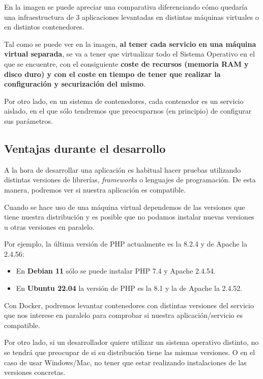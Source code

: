 En la imagen se puede apreciar una comparativa diferenciando cómo quedaría una infraestructura de 3 aplicaciones levantadas en distintas máquinas virtuales o en distintos contenedores.

Tal como se puede ver en la imagen, \textbf{al tener cada servicio en una máquina virtual separada}, se va a tener que virtualizar todo el Sistema Operativo en el que se encuentre, con el consiguiente \textbf{coste de recursos (memoria RAM y disco duro) y con el coste en tiempo de tener que realizar la configuración y securización del mismo}.


Por otro lado, en un sistema de contenedores, cada contenedor es un servicio aislado, en el que sólo tendremos que preocuparnos (en principio) de configurar sus parámetros.


\subsection{Ventajas durante el desarrollo}

A la hora de desarrollar una aplicación es habitual hacer pruebas utilizando distintas versiones de librerías, \textit{frameworks} o lenguajes de programación. De esta manera, podremos ver si nuestra aplicación es compatible.

Cuando se hace uso de una máquina virtual dependemos de las versiones que tiene nuestra distribución y es posible que no podamos instalar nuevas versiones u otras versiones en paralelo.

Por ejemplo, la última versión de PHP actualmente es la 8.2.4 y de Apache la 2.4.56:

\begin{itemize}
    \item En\textbf{ Debian 11} sólo se puede instalar PHP 7.4 y Apache 2.4.54.
    \item En \textbf{Ubuntu 22.04} la versión de PHP es la 8.1 y la de Apache la 2.4.52.
\end{itemize}

Con Docker, podremos levantar contenedores con distintas versiones del servicio que nos interese en paralelo para comprobar si nuestra aplicación/servicio es compatible.


Por otro lado, si un desarrollador quiere utilizar un sistema operativo distinto, no se tendrá que preocupar de si su distribución tiene las mismas versiones. O en el caso de usar Windows/Mac, no tener que estar realizando instalaciones de las versiones concretas.


